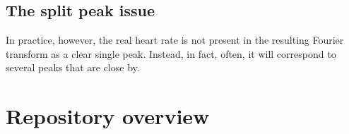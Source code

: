 \subsection{The split peak issue}
In practice, however, the real heart rate is not present in the resulting Fourier transform as a clear single peak. Instead, in fact, often, it will correspond to several peaks that are close by.

\section{Repository overview}